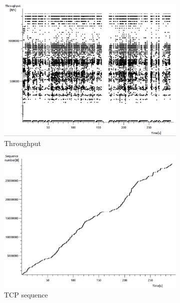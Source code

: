 \documentclass[conference,a4paper]{../../sty/IEEEtran}
\begin{document}
\begin{figure}
 \centering
 \begin{subfigure}[b]{0.2\textwidth}
  \includegraphics[width=\textwidth]{s8-0_th}
  \caption{Throughput}
 \end{subfigure}
 \begin{subfigure}[b]{0.2\textwidth}
  \includegraphics[width=\textwidth]{s8-0_seq}
  \caption{TCP sequence}
 \end{subfigure}
 \begin{subfigure}[b]{0.2\textwidth}

\end{subfigure}
\end{figure}
\end{document}
